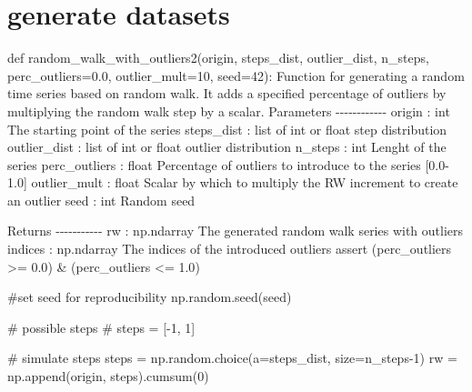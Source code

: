 \documentclass[
  letterpaper,
  DIV=11,
  numbers=noendperiod,
  oneside]{scrreprt}
\newenvironment{Shaded}{\begin{snugshade}}{\end{snugshade}}
\newcommand{\CommentTok}[1]{\textcolor[rgb]{0.37,0.37,0.37}{#1}}
\newcommand{\ControlFlowTok}[1]{\textcolor[rgb]{0.00,0.23,0.31}{#1}}
\newcommand{\DecValTok}[1]{\textcolor[rgb]{0.68,0.00,0.00}{#1}}
\newcommand{\FloatTok}[1]{\textcolor[rgb]{0.68,0.00,0.00}{#1}}
\newcommand{\KeywordTok}[1]{\textcolor[rgb]{0.00,0.23,0.31}{#1}}
\newcommand{\NormalTok}[1]{\textcolor[rgb]{0.00,0.23,0.31}{#1}}
\newcommand{\OperatorTok}[1]{\textcolor[rgb]{0.37,0.37,0.37}{#1}}
\begin{document}
\hypertarget{generate-datasets}{%
\section{generate datasets}\label{generate-datasets}}

\begin{Shaded}
\begin{Highlighting}[]
\KeywordTok{def}\NormalTok{ random\_walk\_with\_outliers2(origin, steps\_dist, outlier\_dist, n\_steps, perc\_outliers}\OperatorTok{=}\FloatTok{0.0}\NormalTok{, outlier\_mult}\OperatorTok{=}\DecValTok{10}\NormalTok{, seed}\OperatorTok{=}\DecValTok{42}\NormalTok{):}
    \CommentTok{\textquotesingle{}\textquotesingle{}\textquotesingle{}}
\CommentTok{    Function for generating a random time series based on random walk.}
\CommentTok{    It adds a specified percentage of outliers by multiplying the random walk step by a scalar.}
\CommentTok{    }
\CommentTok{    Parameters}
\CommentTok{    {-}{-}{-}{-}{-}{-}{-}{-}{-}{-}{-}{-}}
\CommentTok{    origin : int}
\CommentTok{        The starting point of the series}
\CommentTok{    steps\_dist : list of int or float}
\CommentTok{        step distribution}
\CommentTok{    outlier\_dist : list of int or float}
\CommentTok{        outlier distribution}
\CommentTok{    n\_steps : int}
\CommentTok{        Lenght of the series}
\CommentTok{    perc\_outliers : float}
\CommentTok{        Percentage of outliers to introduce to the series [0.0{-}1.0]}
\CommentTok{    outlier\_mult : float}
\CommentTok{        Scalar by which to multiply the RW increment to create an outlier}
\CommentTok{    seed : int}
\CommentTok{        Random seed}

\CommentTok{    Returns}
\CommentTok{    {-}{-}{-}{-}{-}{-}{-}{-}{-}{-}{-}}
\CommentTok{    rw : np.ndarray}
\CommentTok{        The generated random walk series with outliers}
\CommentTok{    indices : np.ndarray}
\CommentTok{        The indices of the introduced outliers }
\CommentTok{    \textquotesingle{}\textquotesingle{}\textquotesingle{}}
    \ControlFlowTok{assert}\NormalTok{ (perc\_outliers }\OperatorTok{\textgreater{}=} \FloatTok{0.0}\NormalTok{) }\OperatorTok{\&}\NormalTok{ (perc\_outliers }\OperatorTok{\textless{}=} \FloatTok{1.0}\NormalTok{)}
    
    \CommentTok{\#set seed for reproducibility}
\NormalTok{    np.random.seed(seed)}
    
    \CommentTok{\# possible steps}
    \CommentTok{\# steps = [{-}1, 1]}

    \CommentTok{\# simulate steps}
\NormalTok{    steps }\OperatorTok{=}\NormalTok{ np.random.choice(a}\OperatorTok{=}\NormalTok{steps\_dist, size}\OperatorTok{=}\NormalTok{n\_steps}\OperatorTok{{-}}\DecValTok{1}\NormalTok{)}
\NormalTok{    rw }\OperatorTok{=}\NormalTok{ np.append(origin, steps).cumsum(}\DecValTok{0}\NormalTok{)}
    

\end{Highlighting}
\end{Shaded}
\end{document}
